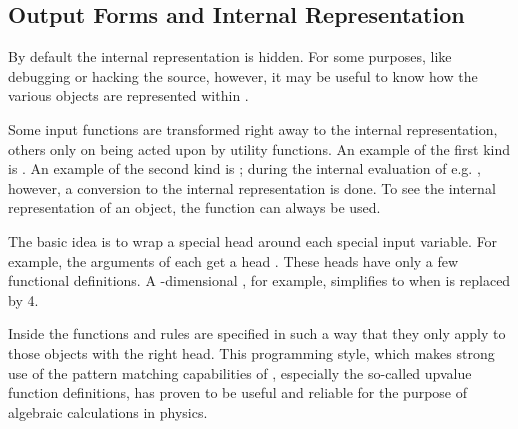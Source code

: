 \subsection{Output Forms and Internal Representation}
\label{int}

By default the internal representation is hidden.
For some purposes, like debugging or hacking the \fc source, however, it may be useful to know how the various objects are represented within \fc.

Some input functions are transformed right away to the internal representation, others only on
being acted upon by utility functions. An example of the first kind is .
An example of the second kind is ; during the internal evaluation of e.g.
, however, a conversion to the internal
representation is done. To see the internal representation of an object, the function
 can always be used.

The basic idea is to wrap a special head around each special input variable.
For example, the arguments of  each get a head 
. These heads have only a few 
functional definitions. A -dimensional , for example, 
simplifies to  when  is replaced by 4.

Inside \fc the functions and rules are specified in such a way that they only 
apply to those objects with the right head. 
This programming style, which makes strong use of the pattern matching 
capabilities of \mma, especially the so-called upvalue function definitions, 
has proven to be useful and reliable for the purpose of 
algebraic calculations in physics.


